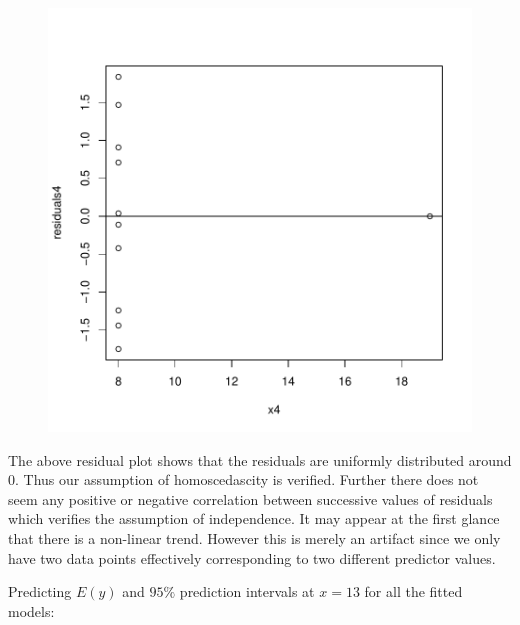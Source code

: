 \documentclass[12pt]{article}
\begin{document}
\begin{itemize}
\begin{figure}[H]
\includegraphics{HW6-029}
\end{figure}
The above residual plot shows that the residuals are uniformly distributed around 0. Thus our assumption of homoscedascity is verified. Further there does not seem any positive or negative correlation between successive values of residuals which verifies the assumption of independence. It may appear at the first glance that there is a non-linear trend. However this is merely an artifact since we only have two data points effectively corresponding to two different predictor values. \\

\end{itemize}

\item Predicting $E(y)$ and $95\%$ prediction intervals at $x=13$ for all the fitted models:
\end{document}
